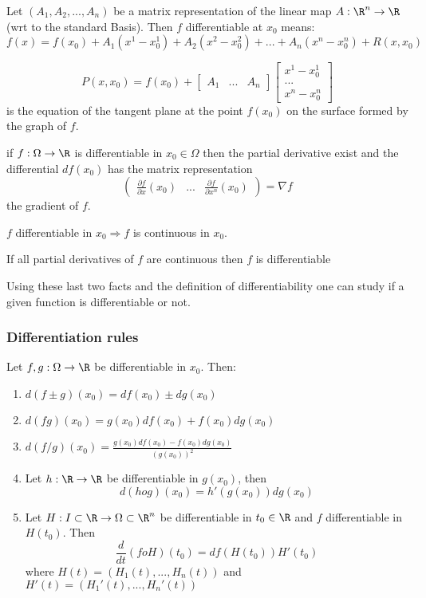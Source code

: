 \documentclass[a4paper]{article}
\begin{document}
Let $(A_1, A_2, ... , A_n)$ be a matrix representation of the linear map $A:\R^n \rightarrow \R$ (wrt to the standard Basis). Then $f$ differentiable at $x_0$ means:
$$f(x)=f(x_0)+A_1(x^1-x_0^1)+A_2(x^2-x_0^2)+...+A_n(x^n-x_0^n)+R(x,x_0)$$

\[P(x,x_0)=f(x_0)+\begin{bmatrix}
A_1 & ... & A_n
\end{bmatrix} \begin{bmatrix}
x^1-x_0^1 \\ 
... \\ 
x^n-x_0^n
\end{bmatrix} \]
is the equation of the tangent plane at the point $f(x_0)$ on the surface formed by the graph of $f$.

\begin{fact}{}
if $f:\Omega \rightarrow \R$ is differentiable in $x_0 \in \Omega$ then the partial derivative exist and the differential $df(x_0)$ has the matrix representation $$\begin{pmatrix}
\frac{\partial f}{\partial x}(x_0) & ... & \frac{\partial f}{\partial x^n}(x_0) \end{pmatrix} = \nabla f$$ the gradient of $f$.
\end{fact}
\begin{fact}{}
$f$ differentiable in $x_0 \Rightarrow f$ is continuous in $x_0$.
\end{fact}
\begin{fact}{}
If all partial derivatives of $f$ are continuous then $f$ is differentiable
\end{fact}

Using these last two facts and the definition of differentiability one can study if a given function is differentiable or not. 

\subsubsection{Differentiation rules}
Let $f,g:\Omega \rightarrow \R$ be differentiable in $x_0$. Then:
\begin{enumerate}
\item $d(f\pm g)(x_0)=df(x_0)\pm dg(x_0)$
\item $d(fg)(x_0)=g(x_0)df(x_0)+f(x_0)dg(x_0)$
\item $d(f/g)(x_0)=\frac{g(x_0)df(x_0)-f(x_0)dg(x_0)}{(g(x_0))^2}$
\item Let $h:\R \rightarrow \R$ be differentiable in $g(x_0)$, then
$$d(h o g)(x_0)=h'(g(x_0))dg(x_0)$$
\item Let $H:I\subset \R \rightarrow \Omega \subset \R^n$ be differentiable in $t_0 \in \R$ and $f$ differentiable in $H(t_0)$. Then 
$$\frac{d}{dt} (f o H)(t_0)=df(H(t_0))H'(t_0)$$ where $H(t)=(H_1(t),...,H_n(t))$ and $H'(t)=(H_1'(t), ..., H_n'(t))$
\end{enumerate}
\end{document}
